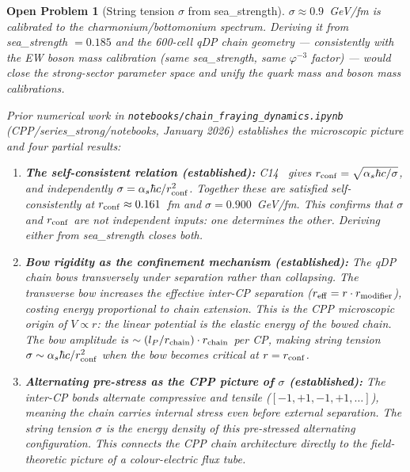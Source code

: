 \documentclass[11pt,letterpaper]{article}
\newtheorem{openprob}[theorem]{Open Problem}
\newcommand{\lP}{l_P}
\newcommand{\phig}{\varphi}
\begin{document}
\begin{openprob}[String tension $\sigma$ from sea\_strength]
\label{op:sigma}
$\sigma \approx 0.9$~GeV/fm is calibrated to the charmonium/bottomonium
spectrum.  Deriving it from sea\_strength $= 0.185$ and the 600-cell
qDP chain geometry --- consistently with the EW boson mass
calibration (same sea\_strength, same $\phig^{-3}$ factor) ---
would close the strong-sector parameter space and unify the quark
mass and boson mass calibrations.

Prior numerical work in \texttt{notebooks/chain\_fraying\_dynamics.ipynb}
(CPP/series\_strong/notebooks, January 2026) establishes the microscopic
picture and four partial results:

\begin{enumerate}
\item \textbf{The self-consistent relation (established):}
  C14~\citep{c14} gives $r_{\rm conf} = \sqrt{\alpha_s \hbar c /
  \sigma}$, and independently $\sigma = \alpha_s \hbar c /
  r_{\rm conf}^2$.  Together these are satisfied self-consistently
  at $r_{\rm conf} \approx 0.161$~fm and $\sigma = 0.900$~GeV/fm.
  This confirms that $\sigma$ and $r_{\rm conf}$ are not independent
  inputs: one determines the other.  Deriving either from
  sea\_strength closes both.

\item \textbf{Bow rigidity as the confinement mechanism (established):}
  The qDP chain bows transversely under separation rather than
  collapsing.  The transverse bow increases the effective inter-CP
  separation ($r_{\rm eff} = r \cdot r_{\rm modifier}$), costing
  energy proportional to chain extension.  This is the CPP microscopic
  origin of $V \propto r$: the linear potential is the elastic energy
  of the bowed chain.  The bow amplitude is $\sim (\lP/r_{\rm chain})
  \cdot r_{\rm chain}$ per CP, making string tension
  $\sigma \sim \alpha_s \hbar c / r_{\rm conf}^2$ when the bow
  becomes critical at $r = r_{\rm conf}$.

\item \textbf{Alternating pre-stress as the CPP picture of $\sigma$
  (established):}
  The inter-CP bonds alternate compressive and tensile
  ($[-1,+1,-1,+1,\ldots]$), meaning the chain carries internal
  stress even before external separation.  The string tension
  $\sigma$ is the energy density of this pre-stressed alternating
  configuration.  This connects the CPP chain architecture directly
  to the field-theoretic picture of a colour-electric flux tube.


\end{enumerate}
\end{openprob}
\end{document}
